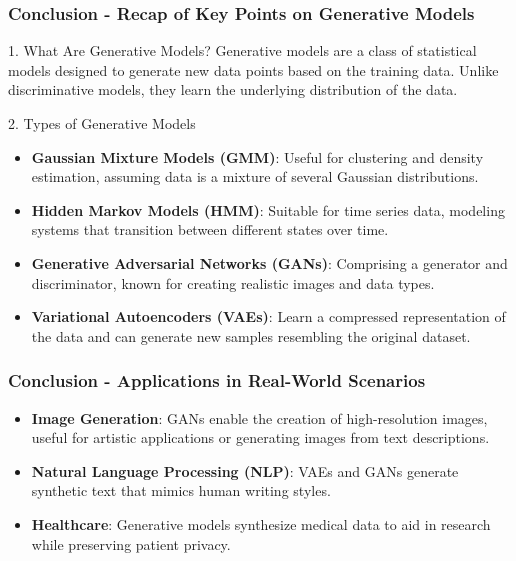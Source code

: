 \documentclass[aspectratio=169]{beamer}
\begin{document}
\begin{frame}[fragile]
  \frametitle{Conclusion - Recap of Key Points on Generative Models}
  \begin{block}{1. What Are Generative Models?}
    Generative models are a class of statistical models designed to generate new data points based on the training data. Unlike discriminative models, they learn the underlying distribution of the data.
  \end{block}
  
  \begin{block}{2. Types of Generative Models}
    \begin{itemize}
      \item \textbf{Gaussian Mixture Models (GMM)}: Useful for clustering and density estimation, assuming data is a mixture of several Gaussian distributions.
      \item \textbf{Hidden Markov Models (HMM)}: Suitable for time series data, modeling systems that transition between different states over time.
      \item \textbf{Generative Adversarial Networks (GANs)}: Comprising a generator and discriminator, known for creating realistic images and data types.
      \item \textbf{Variational Autoencoders (VAEs)}: Learn a compressed representation of the data and can generate new samples resembling the original dataset.
    \end{itemize}
  \end{block}
\end{frame}

\begin{frame}[fragile]
  \frametitle{Conclusion - Applications in Real-World Scenarios}
  \begin{itemize}
    \item \textbf{Image Generation}: GANs enable the creation of high-resolution images, useful for artistic applications or generating images from text descriptions.
    \item \textbf{Natural Language Processing (NLP)}: VAEs and GANs generate synthetic text that mimics human writing styles.
    \item \textbf{Healthcare}: Generative models synthesize medical data to aid in research while preserving patient privacy.
  \end{itemize}
\end{frame}
\end{document}
